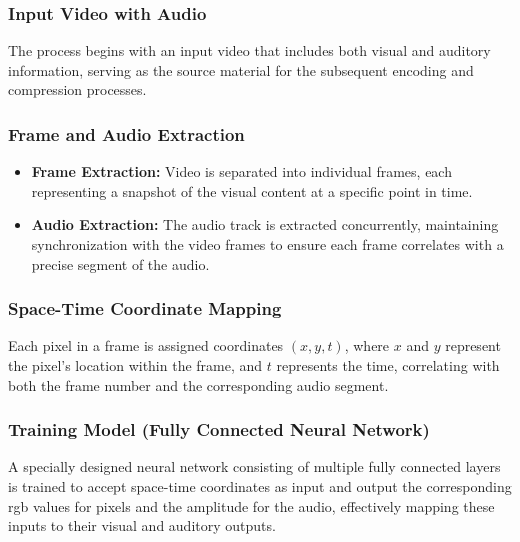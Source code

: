 \documentclass{ioereport}
\begin{document}
        \subsubsection{Input Video with Audio}
        The process begins with an input video that includes both visual and auditory information, serving as the source material for the subsequent encoding and compression processes.

        \subsubsection{Frame and Audio Extraction}
            \begin{itemize}
              \item \textbf{Frame Extraction:} Video is separated into individual frames, each representing a snapshot of the visual content at a specific point in time.
              \item \textbf{Audio Extraction:} The audio track is extracted concurrently, maintaining synchronization with the video frames to ensure each frame correlates with a precise segment of the audio.
                \end{itemize}
    
        \subsubsection{Space-Time Coordinate Mapping}
        Each pixel in a frame is assigned coordinates $(x, y, t)$, where $x$ and $y$ represent the pixel's location within the frame, and $t$ represents the time, correlating with both the frame number and the corresponding audio segment.
        
        \subsubsection{Training Model (Fully Connected Neural Network)}
        A specially designed neural network consisting of multiple fully connected layers is trained to accept space-time coordinates as input and output the corresponding \gls{rgb} values for pixels and the amplitude for the audio, effectively mapping these inputs to their visual and auditory outputs.
    
\end{document}
